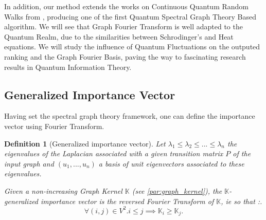 \documentclass[sn-mathphys]{sn-jnl}%
\theoremstyle{thmstyleone}%
\theoremstyle{thmstyletwo}%
\theoremstyle{thmstylethree}%
\newtheorem{definition}[theo]{Definition}
\begin{document}
In addition, our method extends the works on Continuous Quantum Random
Walks from \cite{sanchez-burillo_duch_gomez-gardenes_zueco_2012},
producing one of the first Quantum Spectral Graph Theory Based
algorithm. We will see that Graph Fourier Transform is well adapted to
the Quantum Realm, due to the similarities between Schrodinger's and
Heat equations. We will study the influence of Quantum Fluctuations on
the outputed ranking and the Graph Fourier Basis, paving the way to
fascinating research results in Quantum Information Theory.
 
\subsection{Generalized Importance Vector}
Having set the spectral graph theory framework, one can define the
importance vector using Fourier Transform.

\begin{definition}[Generalized importance
  vector]\label{def:generalized_importance_vector}
  Let $\lambda_1 \leq \lambda_2 \leq ... \leq \lambda_n$ the
  eigenvalues of the Laplacian associated with a given transition
  matrix $P$ of the input graph and $(u_1, ..., u_n)$ a basis of unit
  eigenvectors associated to these eigenvalues.

  Given a non-increasing Graph Kernel $\mathbb{K}$ (see
  \ref{par:graph_kernel}), the $\mathbb{K}$-generalized importance
  vector is the reversed Fourier Transform of $\mathbb{K}$, ie so that
  :.
\begin{equation}
    \forall (i,j) \in V^2. i \leq j \implies \mathbb{K}_i \geq \mathbb{K}_j.
\end{equation}

\end{definition}
\end{document}
